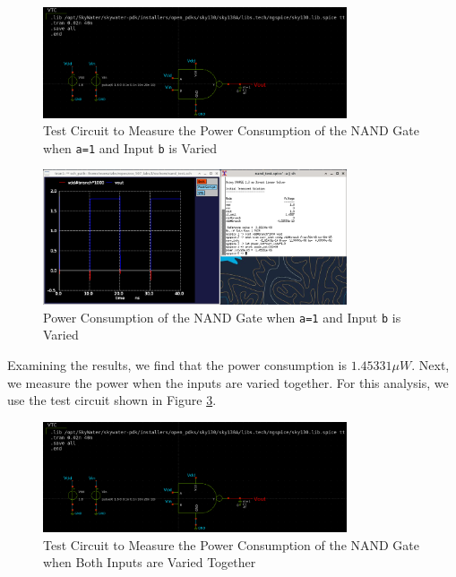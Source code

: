 \documentclass[fleqn]{article}
\begin{document}
	\begin{figure}[H]
		\centerline{\includegraphics[width=0.8\textwidth]{nand_power_test_sweep_vb.png}}
		\caption{Test Circuit to Measure the Power Consumption of the NAND Gate when \texttt{a=1} and Input \texttt{b} is Varied}
		\label{fig::nand_power_test_sweep_vb}
	\end{figure}
	
	\begin{figure}[H]
		\centerline{\includegraphics[width=0.8\textwidth]{nand_power_sweep_vb.png}}
		\caption{Power Consumption of the NAND Gate when \texttt{a=1} and Input \texttt{b} is Varied}
		\label{fig::nand_power_sweep_vb}
	\end{figure}
	
	Examining the results, we find that the power consumption is $1.45331{\mu}W$. Next, we measure the power when the inputs are varied together. For this analysis, we use the test circuit shown in Figure \ref{fig::nand_power_test_sweep_va_vb}.
	
	\begin{figure}[H]
		\centerline{\includegraphics[width=0.8\textwidth]{nand_power_test_sweep_vb.png}}
		\caption{Test Circuit to Measure the Power Consumption of the NAND Gate when Both Inputs are Varied Together}
		\label{fig::nand_power_test_sweep_va_vb}
	\end{figure}
	
\end{document}
